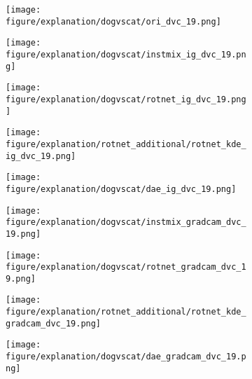 \documentclass{article} \usepackage{iclr2021_conference,times}
\begin{document}
\begin{figure}[t]
\begin{subfigure}{.11\textwidth}
  \centering
  \texttt{[image: figure/explanation/dogvscat/ori\_dvc\_19.png]}
\end{subfigure}
\hspace{-2mm}
\begin{subfigure}{.11\textwidth}
  \centering
  \texttt{[image: figure/explanation/dogvscat/instmix\_ig\_dvc\_19.png]}
\end{subfigure}
\hspace{-2mm}
\begin{subfigure}{.11\textwidth}
  \centering
  \texttt{[image: figure/explanation/dogvscat/rotnet\_ig\_dvc\_19.png]}
\end{subfigure}
\hspace{-2mm}
\begin{subfigure}{.11\textwidth}
  \centering
  \texttt{[image: figure/explanation/rotnet\_additional/rotnet\_kde\_ig\_dvc\_19.png]}
\end{subfigure}
\hspace{-2mm}
\begin{subfigure}{.11\textwidth}
  \centering
  \texttt{[image: figure/explanation/dogvscat/dae\_ig\_dvc\_19.png]}
\end{subfigure}
\hspace{-2mm}
\begin{subfigure}{.11\textwidth}
  \centering
  \texttt{[image: figure/explanation/dogvscat/instmix\_gradcam\_dvc\_19.png]}
\end{subfigure}
\hspace{-2mm}
\begin{subfigure}{.11\textwidth}
  \centering
  \texttt{[image: figure/explanation/dogvscat/rotnet\_gradcam\_dvc\_19.png]}
\end{subfigure}
\hspace{-2mm}
\begin{subfigure}{.11\textwidth}
  \centering
  \texttt{[image: figure/explanation/rotnet\_additional/rotnet\_kde\_gradcam\_dvc\_19.png]}
\end{subfigure}
\hspace{-2mm}
\begin{subfigure}{.11\textwidth}
  \centering
  \texttt{[image: figure/explanation/dogvscat/dae\_gradcam\_dvc\_19.png]}
\end{subfigure}\\
\begin{subfigure}{.11\textwidth}

\end{subfigure}
\end{figure}
\end{document}
